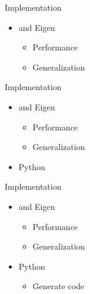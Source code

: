 \documentclass[10pt, t, xcolor=dvipsnames]{beamer}
\begin{document}
{{{{{\begin{frame}[fragile]{Implementation}
    \begin{itemize}
        \item \CC and Eigen
            \begin{itemize}
                \item Performance
                \item Generalization
            \end{itemize}
    \end{itemize}
\end{frame}

\begin{frame}[fragile]{Implementation}
    \begin{itemize}
        \item \CC and Eigen
            \begin{itemize}
                \item Performance
                \item Generalization
            \end{itemize}
        \item Python
    \end{itemize}
\end{frame}

\begin{frame}[fragile]{Implementation}
    \begin{itemize}
        \item \CC and Eigen
            \begin{itemize}
                \item Performance
                \item Generalization
            \end{itemize}
        \item Python
            \begin{itemize}
               \item Generate \CC code 
            \end{itemize}
    \end{itemize}
\end{frame}

}}}}}
\end{document}
